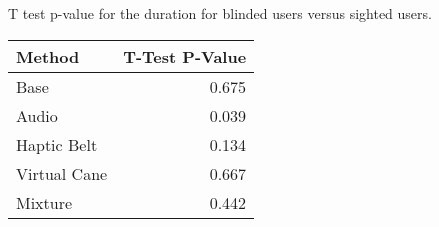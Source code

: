 
\centering
\caption{T test p-value for the duration for blinded users versus sighted users.}
\label{tab:ttest_duration}
\begin{tabular}{lr}
\toprule
      Method &  T-Test P-Value \\
\midrule
        Base &           0.675 \\
       Audio &           0.039 \\
 Haptic Belt &           0.134 \\
Virtual Cane &           0.667 \\
     Mixture &           0.442 \\
\bottomrule
\end{tabular}
